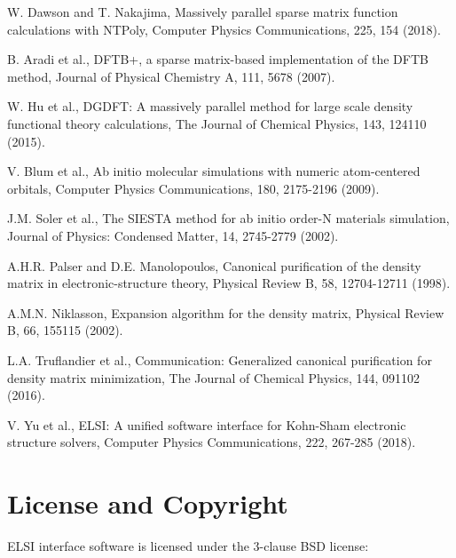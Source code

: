 \documentclass{report}
\begin{document}
\begin{thebibliography}{9}
W. Dawson and T. Nakajima, Massively parallel sparse matrix function calculations with NTPoly, Computer Physics Communications, 225, 154 (2018).

B. Aradi et al., DFTB+, a sparse matrix-based implementation of the DFTB method, Journal of Physical Chemistry A, 111, 5678 (2007).

W. Hu et al., DGDFT: A massively parallel method for large scale density functional theory calculations, The Journal of Chemical Physics, 143, 124110 (2015).

V. Blum et al., Ab initio molecular simulations with numeric atom-centered orbitals, Computer Physics Communications, 180, 2175-2196 (2009).

J.M. Soler et al., The SIESTA method for ab initio order-N materials simulation, Journal of Physics: Condensed Matter, 14, 2745-2779 (2002).

A.H.R. Palser and D.E. Manolopoulos, Canonical purification of the density matrix in electronic-structure theory, Physical Review B, 58, 12704-12711 (1998).

A.M.N. Niklasson, Expansion algorithm for the density matrix, Physical Review B, 66, 155115 (2002).

L.A. Truflandier et al., Communication: Generalized canonical purification for density matrix minimization, The Journal of Chemical Physics, 144, 091102 (2016).

V. Yu et al., ELSI: A unified software interface for Kohn-Sham electronic structure solvers, Computer Physics Communications, 222, 267-285 (2018).

\end{thebibliography}

\chapter*{License and Copyright}
ELSI interface software is licensed under the 3-clause BSD license:
\end{document}
